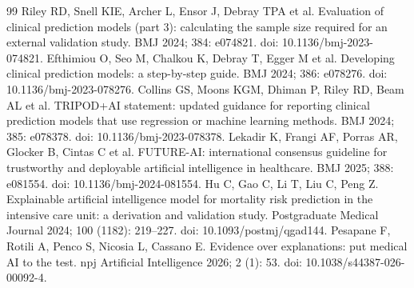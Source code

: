 \documentclass{elektr}
\begin{document}
\begin{thebibliography}{99}
 Riley RD, Snell KIE, Archer L, Ensor J, Debray TPA et al. Evaluation of clinical prediction models (part 3): calculating the sample size required for an external validation study. BMJ 2024; 384: e074821. doi: 10.1136/bmj-2023-074821.
 Efthimiou O, Seo M, Chalkou K, Debray T, Egger M et al. Developing clinical prediction models: a step-by-step guide. BMJ 2024; 386: e078276. doi: 10.1136/bmj-2023-078276.
 Collins GS, Moons KGM, Dhiman P, Riley RD, Beam AL et al. TRIPOD+AI statement: updated guidance for reporting clinical prediction models that use regression or machine learning methods. BMJ 2024; 385: e078378. doi: 10.1136/bmj-2023-078378.
 Lekadir K, Frangi AF, Porras AR, Glocker B, Cintas C et al. FUTURE-AI: international consensus guideline for trustworthy and deployable artificial intelligence in healthcare. BMJ 2025; 388: e081554. doi: 10.1136/bmj-2024-081554.
 Hu C, Gao C, Li T, Liu C, Peng Z. Explainable artificial intelligence model for mortality risk prediction in the intensive care unit: a derivation and validation study. Postgraduate Medical Journal 2024; 100 (1182): 219--227. doi: 10.1093/postmj/qgad144.
 Pesapane F, Rotili A, Penco S, Nicosia L, Cassano E. Evidence over explanations: put medical AI to the test. npj Artificial Intelligence 2026; 2 (1): 53. doi: 10.1038/s44387-026-00092-4.
\end{thebibliography}
\end{document}
